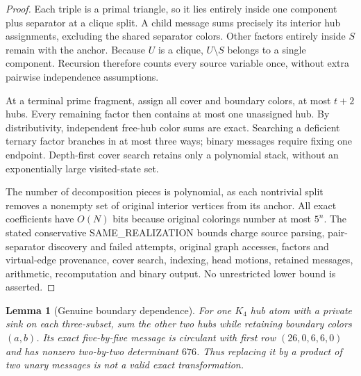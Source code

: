 \documentclass[11pt]{article}
\newtheorem{lemma}{Lemma}
\begin{document}
\begin{proof}
Each triple is a primal triangle, so it lies entirely
inside one component plus separator at a clique split.
A child message sums precisely its interior hub assignments,
excluding the shared separator colors. Other factors
entirely inside $S$ remain with the anchor. Because $U$
is a clique, $U\setminus S$ belongs to a single component.
Recursion therefore counts every source variable once,
without extra pairwise independence assumptions.

At a terminal prime fragment, assign all cover and boundary
colors, at most $t+2$ hubs. Every remaining factor then
contains at most one unassigned hub. By distributivity,
independent free-hub color sums are exact. Searching a
deficient ternary factor branches in at most three ways;
binary messages require fixing one endpoint. Depth-first
cover search retains only a polynomial stack, without an
exponentially large visited-state set.

The number of decomposition pieces is polynomial, as each
nontrivial split removes a nonempty set of original
interior vertices from its anchor. All exact coefficients
have $O(N)$ bits because original colorings number at most
$5^n$. The stated conservative SAME\_REALIZATION bounds
charge source parsing, pair-separator discovery and failed
attempts, original graph accesses, factors and virtual-edge
provenance, cover search, indexing, head motions, retained
messages, arithmetic, recomputation and binary output.
No unrestricted lower bound is asserted.
\end{proof}

\begin{lemma}[Genuine boundary dependence]
For one $K_4$ hub atom with a private sink on each
three-subset, sum the other two hubs while retaining
boundary colors $(a,b)$. Its exact five-by-five message
is circulant with first row $(26,0,6,6,0)$ and
has nonzero two-by-two determinant $676$.
Thus replacing it by a product of two unary messages is
not a valid exact transformation.
\end{lemma}
\end{document}
